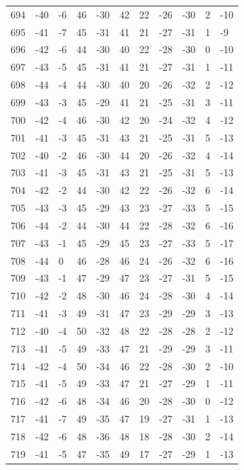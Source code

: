 \begin{table}[H]
\begin{tabular}{lllllllllll}
694 & -40 & -6 & 46 & -30 & 42 & 22 & -26 & -30 & 2 & -10 \\
695 & -41 & -7 & 45 & -31 & 41 & 21 & -27 & -31 & 1 & -9 \\
696 & -42 & -6 & 44 & -30 & 40 & 22 & -28 & -30 & 0 & -10 \\
697 & -43 & -5 & 45 & -31 & 41 & 21 & -27 & -31 & 1 & -11 \\
698 & -44 & -4 & 44 & -30 & 40 & 20 & -26 & -32 & 2 & -12 \\
699 & -43 & -3 & 45 & -29 & 41 & 21 & -25 & -31 & 3 & -11 \\
700 & -42 & -4 & 46 & -30 & 42 & 20 & -24 & -32 & 4 & -12 \\
701 & -41 & -3 & 45 & -31 & 43 & 21 & -25 & -31 & 5 & -13 \\
702 & -40 & -2 & 46 & -30 & 44 & 20 & -26 & -32 & 4 & -14 \\
703 & -41 & -3 & 45 & -31 & 43 & 21 & -25 & -31 & 5 & -13 \\
704 & -42 & -2 & 44 & -30 & 42 & 22 & -26 & -32 & 6 & -14 \\
705 & -43 & -3 & 45 & -29 & 43 & 23 & -27 & -33 & 5 & -15 \\
706 & -44 & -2 & 44 & -30 & 44 & 22 & -28 & -32 & 6 & -16 \\
707 & -43 & -1 & 45 & -29 & 45 & 23 & -27 & -33 & 5 & -17 \\
708 & -44 & 0 & 46 & -28 & 46 & 24 & -26 & -32 & 6 & -16 \\
709 & -43 & -1 & 47 & -29 & 47 & 23 & -27 & -31 & 5 & -15 \\
710 & -42 & -2 & 48 & -30 & 46 & 24 & -28 & -30 & 4 & -14 \\
711 & -41 & -3 & 49 & -31 & 47 & 23 & -29 & -29 & 3 & -13 \\
712 & -40 & -4 & 50 & -32 & 48 & 22 & -28 & -28 & 2 & -12 \\
713 & -41 & -5 & 49 & -33 & 47 & 21 & -29 & -29 & 3 & -11 \\
714 & -42 & -4 & 50 & -34 & 46 & 22 & -28 & -30 & 2 & -10 \\
715 & -41 & -5 & 49 & -33 & 47 & 21 & -27 & -29 & 1 & -11 \\
716 & -42 & -6 & 48 & -34 & 46 & 20 & -28 & -30 & 0 & -12 \\
717 & -41 & -7 & 49 & -35 & 47 & 19 & -27 & -31 & 1 & -13 \\
718 & -42 & -6 & 48 & -36 & 48 & 18 & -28 & -30 & 2 & -14 \\
719 & -41 & -5 & 47 & -35 & 49 & 17 & -27 & -29 & 1 & -13 \\

\end{tabular}
\end{table}
